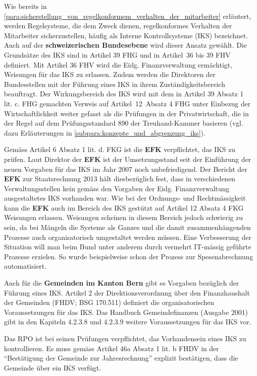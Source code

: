 \documentclass[10pt]{article}
\begin{document}
Wie bereits in \vref{para:sicherstellung_von_regelkonformem_verhalten_der_mitarbeiter} erläutert, werden Regelsysteme, die dem Zweck dienen, regelkonformes Verhalten der Mitarbeiter sicherzustellen, häufig als Interne Kontrollsysteme (IKS) bezeichnet. Auch auf der \textbf{schweizerischen Bundesebene} wird dieser Ansatz gewählt. Die Grundsätze des IKS sind in Artikel 39 FHG und in Artikel~36 bis 39 FHV definiert. Mit Artikel 36 FHV wird die Eidg. Finanzverwaltung ermächtigt, Weisungen für das IKS zu erlassen. Zudem werden die Direktoren der Bundesstellen mit der Führung eines IKS in ihrem Zuständigkeitsbereich beauftragt. Der Wirkungsbereich des IKS wird mit dem in Artikel 39 Absatz 1 lit. c. FHG gemachten Verweis auf Artikel~12~Absatz 4 FHG unter Einbezug der Wirtschaftlichkeit weiter gefasst als die Prüfungen in der Privatwirtschaft, die in der Regel auf dem Prüfungsstandard 890 der Treuhand-Kammer basieren (vgl. dazu Erläuterungen in \vref{subpara:konzepte_und_abgrenzung_iks}).

Gemäss Artikel 6 Absatz 1 lit. d. FKG ist die \textbf{EFK} verpflichtet, das IKS zu prüfen. Laut Direktor der \textbf{EFK} ist der Umsetzungsstand seit der Einführung der neuen Vorgaben für das IKS im Jahr 2007 noch unbefriedigend. Der Bericht der \textbf{EFK} zur Staatsrechnung 2013 hält diesbezüglich fest, dass in verschiedenen Verwaltungsstellen kein gemäss den Vorgaben der Eidg. Finanzverwaltung ausgestaltetes IKS vorhanden war. Wie bei der Ordnungs- und Rechtmässigkeit kann die \textbf{EFK} auch im Bereich des IKS gestützt auf Artikel 12 Absatz 4 FKG Weisungen erlassen. Weisungen scheinen in diesem Bereich jedoch schwierig zu sein, da bei Mängeln die Systeme als Ganzes und die damit zusammenhängenden Prozesse auch organisatorisch umgestaltet werden müssen. Eine Verbesserung der Situation will man beim Bund unter anderem durch vermehrt IT-mässig geführte Prozesse erzielen. So wurde beispielweise schon der Prozess zur Spesen­abrechnung automatisiert.

Auch für die \textbf{Gemeinden im Kanton Bern} gibt es Vorgaben bezüglich der Führung eines IKS. Artikel 2 der Direktionsverordnung über den Finanzhaushalt der Gemeinden (FHDV; BSG 170.511) definiert die organisatorischen Voraussetzungen für das IKS. Das Handbuch Gemeindefinanzen (Ausgabe 2001) gibt in den Kapiteln 4.2.3.8 und 4.2.3.9 weitere Voraussetzungen für das IKS vor.

Das RPO ist bei seinen Prüfungen verpflichtet, das Vorhandensein eines IKS zu kontrollieren. Es muss gemäss Artikel 46a Absatz 1 lit. b FHDV in der “{}Bestätigung der Gemeinde zur Jahresrechnung”{} explizit bestätigen, dass die Gemeinde über ein IKS verfügt. 
\end{document}
